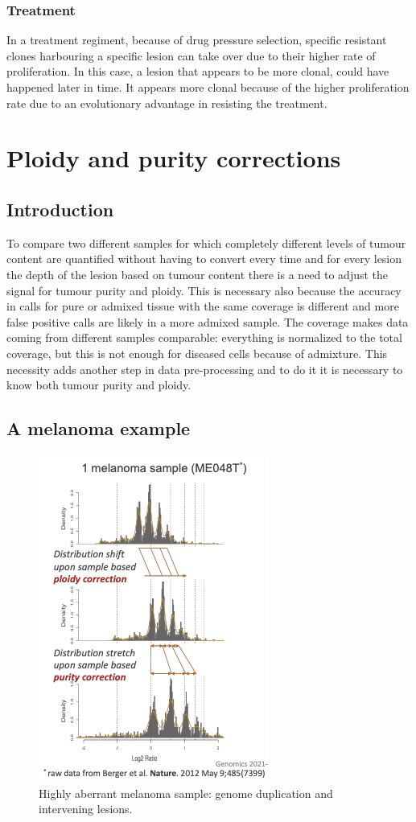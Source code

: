     \subsubsection{Treatment}
    In a treatment regiment, because of drug pressure selection, specific resistant clones harbouring a specific lesion can take over due to their higher rate of proliferation.
    In this case, a lesion that appears to be more clonal, could have happened later in time.
    It appears more clonal because of the higher proliferation rate due to an evolutionary advantage in resisting the treatment.

\section{Ploidy and purity corrections}

  \subsection{Introduction}
  To compare two different samples for which completely different levels of tumour content are quantified without having to convert every time and for every lesion the depth of the lesion based on tumour content there is a need to adjust the signal for tumour purity and ploidy.
  This is necessary also because the accuracy in calls for pure or admixed tissue with the same coverage is different and more false positive calls are likely in a more admixed sample.
  The coverage makes data coming from different samples comparable: everything is normalized to the total coverage, but this is not enough for diseased cells because of admixture.
  This necessity adds another step in data pre-processing and to do it it is necessary to know both tumour purity and ploidy.

  \subsection{A melanoma example}

  \begin{figure}[H]
    \centering
    \includegraphics[width=0.4\linewidth]{image7.png}
    \caption{Highly aberrant melanoma sample: genome duplication and intervening lesions.}
    \label{fig:ploidy1}
  \end{figure}

